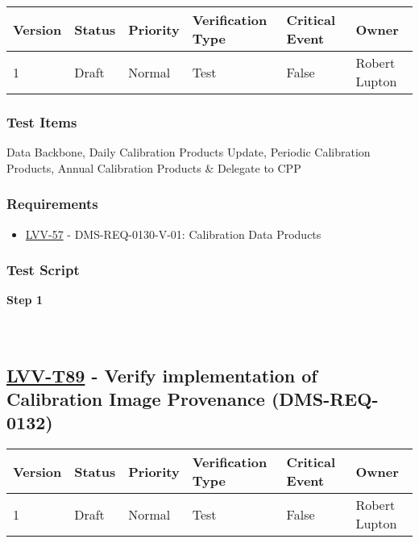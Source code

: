 \begin{longtable}[]{@{}llllll@{}}
\toprule
Version & Status & Priority & Verification Type & Critical Event &
Owner\tabularnewline
\midrule
\endhead
1 & Draft & Normal & Test & False & Robert Lupton\tabularnewline
\bottomrule
\end{longtable}

\hypertarget{test-items-177}{%
\subsubsection{Test Items}\label{test-items-177}}

Data Backbone, Daily Calibration Products Update, Periodic Calibration
Products, Annual Calibration Products \& Delegate to CPP

\hypertarget{requirements-178}{%
\subsubsection{Requirements}\label{requirements-178}}

\begin{itemize}
\tightlist
\item
  \href{https://jira.lsstcorp.org/browse/LVV-57}{LVV-57} -
  DMS-REQ-0130-V-01: Calibration Data Products
\end{itemize}

\hypertarget{test-script-178}{%
\subsubsection{Test Script}\label{test-script-178}}

\textbf{Step 1}\\
~\\
~\\

\hypertarget{lvv-t89---verify-implementation-of-calibration-image-provenance-dms-req-0132}{%
\subsection{\texorpdfstring{\href{https://jira.lsstcorp.org/secure/Tests.jspa\#/testCase/LVV-T89}{LVV-T89}
- Verify implementation of Calibration Image Provenance
(DMS-REQ-0132)}{LVV-T89 - Verify implementation of Calibration Image Provenance (DMS-REQ-0132)}}\label{lvv-t89---verify-implementation-of-calibration-image-provenance-dms-req-0132}}

\begin{longtable}[]{@{}llllll@{}}
\toprule
Version & Status & Priority & Verification Type & Critical Event &
Owner\tabularnewline
\midrule
\endhead
1 & Draft & Normal & Test & False & Robert Lupton\tabularnewline
\bottomrule
\end{longtable}

